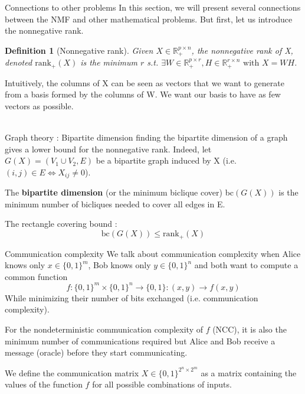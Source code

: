 \documentclass[final]{beamer}
\newlength{\onecolwid}
\newtheorem{defn}[thm]{Definition}
\begin{document}
\begin{frame}
\begin{columns}[t]
\begin{column}{\onecolwid}
\begin{columns}[t]
\begin{column}{\onecolwid}

\begin{exampleblock}{Connections to other problems}
\footnotesize
In this section, we will present several connections between the NMF and other mathematical problems. But first, let us introduce the nonnegative rank.
\begin{defn}[Nonnegative rank]
Given $X \in \mathbb{R}_+^{p\times n}$, the nonnegative rank of X, denoted $\text{rank}_+(X)$ is the minimum $r$ s.t. $\exists W \in \mathbb{R}_+^{p\times r}, H \in \mathbb{R}_+^{r\times n} \text{ with } X = WH$.
\end{defn}

Intuitively, the columns of X can be seen as vectors that we want to generate from a basis formed by the columns of W. We want our basis to have as few vectors as possible.
~\\
~\\
\begin{block}{Graph theory : Bipartite dimension}
finding the bipartite dimension of a graph gives a lower bound for the nonnegative rank. Indeed, let $G(X) = (V_1 \cup V_2, E)$ be a bipartite graph induced by X (i.e. $(i,j)\in E \Leftrightarrow X_{ij}\neq 0$). 
    
    The \textbf{bipartite dimension} (or the minimum biclique cover) bc$(G(X))$ is the minimum number of bicliques needed to cover all edges in E.
    
    The rectangle covering bound : 
    \[\text{bc}(G(X))\leq \text{rank}_+(X)
\]
\end{block}
\begin{block}{Communication complexity}
We talk about communication complexity when Alice knows only $x \in \{0,1\}^m$, Bob knows only $y \in \{0,1\}^n$ and both want to compute a common function
    \[f:\{0,1\}^m \times \{0,1\}^n \rightarrow \{0,1\} : (x,y) \rightarrow f(x,y)
    \]
    While minimizing their number of bits exchanged (i.e. communication complexity).

    For the nondeterministic communication complexity of $f$ (NCC), it is also the minimum number of communications required but Alice and Bob receive a message (oracle) before they start communicating.

    We define the communication matrix $X \in \{0,1\}^{2^n\times 2^m}$ as a matrix containing the values of the function $f$ for all possible combinations of inputs.
    

\end{block}
\end{exampleblock}
\end{column}
\end{columns}
\end{column}
\end{columns}
\end{frame}
\end{document}
